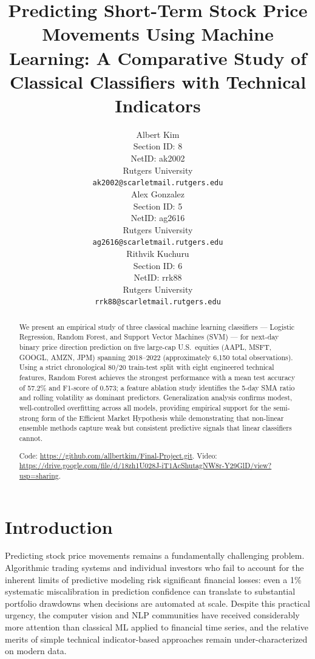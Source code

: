 \documentclass{article}
\title{Predicting Short-Term Stock Price Movements Using Machine Learning: A Comparative Study of Classical Classifiers with Technical Indicators}
\author{%
  Albert Kim \\
  Section ID: 8 \\
  NetID: ak2002 \\
  Rutgers University \\
  \texttt{ak2002@scarletmail.rutgers.edu} \\
  \And
  Alex Gonzalez \\
  Section ID: 5 \\
  NetID: ag2616 \\
  Rutgers University \\
  \texttt{ag2616@scarletmail.rutgers.edu} \\
  \And
  Rithvik Kuchuru \\
  Section ID: 6 \\
  NetID: rrk88 \\
  Rutgers University \\
  \texttt{rrk88@scarletmail.rutgers.edu} \\
}
\begin{document}
\maketitle

\begin{abstract}
We present an empirical study of three classical machine learning classifiers ---
Logistic Regression, Random Forest, and Support Vector Machines (SVM) --- for
next-day binary price direction prediction on five large-cap U.S.\ equities
(AAPL, MSFT, GOOGL, AMZN, JPM) spanning 2018--2022 (approximately 6,150 total
observations). Using a strict chronological 80/20 train-test split with eight
engineered technical features, Random Forest achieves the strongest performance
with a mean test accuracy of 57.2\% and F1-score of 0.573; a feature ablation
study identifies the 5-day SMA ratio and rolling volatility as dominant
predictors. Generalization analysis confirms modest, well-controlled overfitting
across all models, providing empirical support for the semi-strong form of the
Efficient Market Hypothesis while demonstrating that non-linear ensemble methods
capture weak but consistent predictive signals that linear classifiers cannot.

\noindent Code: \url{https://github.com/allbertkim/Final-Project.git}.\newline
\noindent Video: \newline \url{https://drive.google.com/file/d/18zh1U028J-iT1AcShutagNW8r-Y29GlD/view?usp=sharing}.
\end{abstract}

\section{Introduction}

Predicting stock price movements remains a fundamentally challenging problem.
Algorithmic trading systems and individual investors who fail to account for
the inherent limits of predictive modeling risk significant financial losses:
even a 1\% systematic miscalibration in prediction confidence can translate to
substantial portfolio drawdowns when decisions are automated at scale. Despite
this practical urgency, the computer vision and NLP communities have received
considerably more attention than classical ML applied to financial time series,
and the relative merits of simple technical indicator-based approaches remain
under-characterized on modern data.
\end{document}
